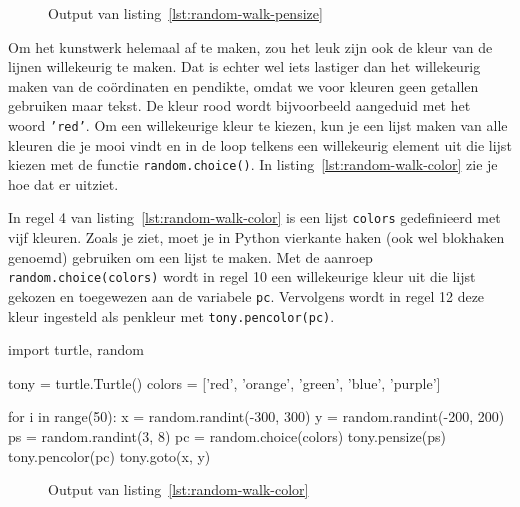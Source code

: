 \documentclass[../main]{subfiles}
\begin{document}
\begin{figure}[ht]
    \centering
    \caption{Output van listing~\ref{lst:random-walk-pensize}}%
    \label{fig:turtle-random-walk-pensize}
\end{figure}

Om het kunstwerk helemaal af te maken, zou het leuk zijn ook de kleur van de lijnen willekeurig te maken. Dat is echter wel iets lastiger dan het willekeurig maken van de coördinaten en pendikte, omdat we voor kleuren geen getallen gebruiken maar tekst. De kleur rood wordt bijvoorbeeld aangeduid met het woord \texttt{'red'}. Om een willekeurige kleur te kiezen, kun je een lijst maken van alle kleuren die je mooi vindt en in de loop telkens een willekeurig element uit die lijst kiezen met de functie \texttt{random.choice()}. In listing~\ref{lst:random-walk-color} zie je hoe dat er uitziet.

In regel 4 van listing~\ref{lst:random-walk-color} is een lijst \texttt{colors} gedefinieerd met vijf kleuren. Zoals je ziet, moet je in Python vierkante haken (ook wel blokhaken genoemd) gebruiken om een lijst te maken. Met de aanroep \texttt{random.choice(colors)} wordt in regel 10 een willekeurige kleur uit die lijst gekozen en toegewezen aan de variabele \texttt{pc}. Vervolgens wordt in regel 12 deze kleur ingesteld als penkleur met \texttt{tony.pencolor(pc)}.

\begin{python}[style=mu, caption={Random walk met willekeurige kleuren}, label={lst:random-walk-color}]
import turtle, random

tony = turtle.Turtle()
colors = ['red', 'orange', 'green', 'blue', 'purple']

for i in range(50):
    x = random.randint(-300, 300)
    y = random.randint(-200, 200)
    ps = random.randint(3, 8)
    pc = random.choice(colors)
    tony.pensize(ps)
    tony.pencolor(pc)
    tony.goto(x, y)    
\end{python}

\begin{figure}[ht]
    \centering
    \caption{Output van listing~\ref{lst:random-walk-color}}%
    \label{fig:turtle-random-walk-color}
\end{figure}
\end{document}
